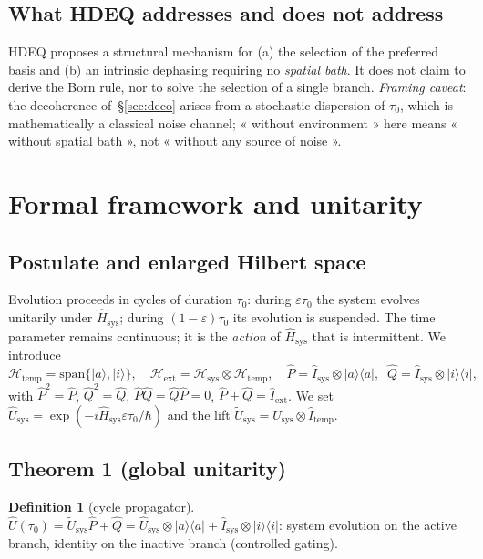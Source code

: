 \documentclass[11pt,a4paper]{article}
\newcommand{\ket}[1]{\lvert #1\rangle}
\newcommand{\bra}[1]{\langle #1\rvert}
\newcommand{\Hext}{\mathcal{H}_{\mathrm{ext}}}
\newcommand{\Hsys}{\mathcal{H}_{\mathrm{sys}}}
\newcommand{\Htemp}{\mathcal{H}_{\mathrm{temp}}}
\newcommand{\Usys}{\hat{U}_{\mathrm{sys}}}
\newcommand{\Hsysop}{\hat{H}_{\mathrm{sys}}}
\newcommand{\Iext}{\hat{I}_{\mathrm{ext}}}
\newcommand{\Isys}{\hat{I}_{\mathrm{sys}}}
\theoremstyle{plain}
\theoremstyle{definition}
\newtheorem{definition}{Definition}
\theoremstyle{remark}
\begin{document}
\subsection{What HDEQ addresses and does not address}
HDEQ proposes a structural mechanism for (a) the selection of the preferred basis
and (b) an intrinsic dephasing requiring no \emph{spatial bath}. It does not claim
to derive the Born rule, nor to solve the selection of a single branch.
\emph{Framing caveat}: the decoherence of~\S\ref{sec:deco} arises from a stochastic
dispersion of $\tau_0$, which is mathematically a classical noise channel; « without
environment » here means « without spatial bath », not « without any source of noise ».

\section{Formal framework and unitarity}\label{sec:cadre}
\subsection{Postulate and enlarged Hilbert space}
Evolution proceeds in cycles of duration $\tau_0$: during $\varepsilon\tau_0$ the
system evolves unitarily under $\Hsysop$; during $(1-\varepsilon)\tau_0$ its
evolution is suspended. The time parameter remains continuous; it is the
\emph{action} of $\Hsysop$ that is intermittent. We introduce
\[
\Htemp=\mathrm{span}\{\ket{a},\ket{i}\},\quad
\Hext=\Hsys\otimes\Htemp,\quad
\hat{P}=\Isys\otimes\ket{a}\bra{a},\;\;
\hat{Q}=\Isys\otimes\ket{i}\bra{i},
\]
with $\hat{P}^2=\hat{P}$, $\hat{Q}^2=\hat{Q}$, $\hat{P}\hat{Q}=\hat{Q}\hat{P}=0$,
$\hat{P}+\hat{Q}=\Iext$. We set $\Usys=\exp(-i\Hsysop\varepsilon\tau_0/\hbar)$ and
the lift $\tilde{U}_{\mathrm{sys}}=\Usys\otimes\hat{I}_{\mathrm{temp}}$.

\subsection{Theorem 1 (global unitarity)}

\begin{definition}[cycle propagator]
$\hat{U}(\tau_0)=\tilde{U}_{\mathrm{sys}}\hat{P}+\hat{Q}
=\Usys\otimes\ket{a}\bra{a}+\Isys\otimes\ket{i}\bra{i}$: system evolution on the
active branch, identity on the inactive branch (controlled gating).
\end{definition}
\end{document}
